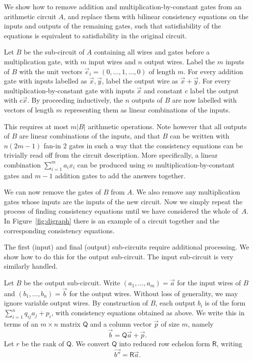We show how to remove addition and multiplication-by-constant gates  from an arithmetic circuit $A$, and replace them with bilinear consistency equations on the inputs and outputs of the remaining gates, such that satisfiability of the equations is equivalent to satisfiability in the original circuit.

 Let $B$ be the sub-circuit of $A$ containing all wires and gates before a multiplication gate, with $m$ input wires and $n$ output wires. Label the $m$ inputs of $B$ with the unit vectors $\vec{e}_i=(0,\ldots,1,\ldots,0)$ of length $m$. For every addition gate with inputs labelled as $\vec{x},\vec{y}$, label the output wire as $\vec{x}+\vec{y}$. For every multiplication-by-constant gate with inputs $\vec{x}$ and constant $c$ label the output with $c\vec{x}$. By proceeding inductively, the $n$ outputs of $B$ are now labelled with vectors of length $m$ representing them as linear combinations of the inputs.

This requires at most $m\left| B \right|$ arithmetic operations. Note however that all outputs of $B$ are linear combinations of the inputs, and that $B$ can be written with $n(2m-1)$ fan-in 2 gates in such a way that the consistency equations can be trivially read off from the circuit description. More specifically, a linear combination $\sum_{i=1}^m a_i x_i$ can be produced using $m$ multiplication-by-constant gates and $m-1$ addition gates to add the answers together.

We can now remove the gates of $B$ from $A$. We also remove any multiplication gates whose inputs are the inputs of the new circuit. Now we simply repeat the process of finding consistency equations until we have considered the whole of~$A$. In Figure~\ref{fig:digraph} there is an example of a circuit together and the corresponding consistency equations.



The first (input) and final (output) sub-circuits require additional processing. We show how to do this for the output sub-circuit. The input sub-circuit is very similarly handled.

Let $B$ be the output sub-circuit. Write $(a_1,\ldots,a_m)=\vec{a}$ for the input wires of $B$ and $(b_1,\ldots,b_n)=\vec{b}$ for the output wires. Without loss of generality, we may ignore variable output wires. By construction of $B$, each output $b_i$ is of the form $\sum_{i=1}^n q_{ij}a_j+p_i$, with consistency equations obtained as above. We write this in terms of an $m\times n$ matrix $\mathsf{Q}$ and a column vector $\vec{p}$ of size $m$, namely
$$\vec{b} = \mathsf{Q} \vec{a}+ \vec{p}.$$
%
Let $r$ be the rank of $\mathsf{Q}$. We convert $\mathsf{Q}$ into reduced row echelon form $\mathsf{R}$, writing
$$\vec{b''}=\mathsf{R}\vec{a}.$$

